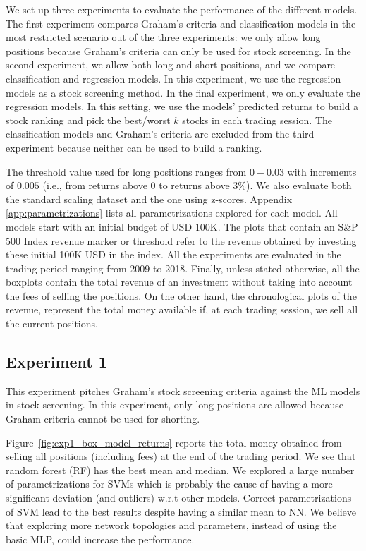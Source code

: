 We set up three experiments to evaluate the performance of the different models. The first experiment compares Graham's criteria and classification models in the most restricted scenario out of the three experiments: we only allow long positions because Graham's criteria can only be used for stock screening. In the second experiment, we allow both long and short positions, and we compare classification and regression models. In this experiment, we use the regression models as a stock screening method. In the final experiment, we only evaluate the regression models. In this setting, we use the models' predicted returns to build a stock ranking and pick the best/worst $k$ stocks in each trading session. The classification models and Graham's criteria are excluded from the third experiment because neither can be used to build a ranking.

The threshold value used for long positions ranges from $0 - 0.03$ with increments of $0.005$ (i.e., from returns above 0 to returns above 3\%). We also evaluate both the standard scaling dataset and the one using z-scores. Appendix \ref{app:parametrizations} lists all parametrizations explored for each model. All models start with an initial budget of USD 100K. The plots that contain an S\&P 500 Index revenue marker or threshold refer to the revenue obtained by investing these initial 100K USD in the index. All the experiments are evaluated in the trading period ranging from 2009 to 2018.
Finally, unless stated otherwise, all the boxplots contain the total revenue of an investment without taking into account the fees of selling the positions. On the other hand, the chronological plots of the revenue, represent the total money available if, at each trading session, we sell all the current positions.


\subsection{Experiment 1}

This experiment pitches Graham's stock screening criteria against the ML models in stock screening. In this experiment, only long positions are allowed because Graham criteria cannot be used for shorting.

Figure~\ref{fig:exp1_box_model_returns} reports the total money obtained from selling all positions (including fees) at the end of the trading period.  %
We see that random forest (RF) has the best mean and median. We explored a large number of parametrizations for SVMs which is probably the cause of having a more significant deviation (and outliers) w.r.t other models. Correct parametrizations of SVM lead to the best results despite having a similar mean to NN. We believe that exploring more network topologies and parameters, instead of using the basic MLP, could increase the performance. %

